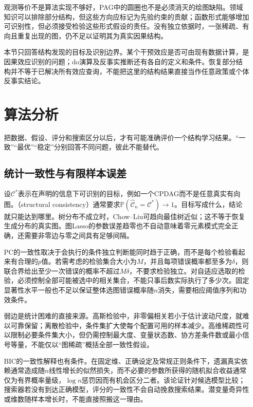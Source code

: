 观测等价不是算法实现不够好，PAG中的圆圈也不是必须消灭的绘图缺陷。领域知识可以排除部分结构，但这些方向应标记为先验约束的贡献；函数形式能够增加可识别性，但必须接受检验这些形式假设的责任。没有独立依据时，一张稀疏、有向且重复出现的图，仍不足以证明其为真实因果结构。

本节只回答结构发现的目标及识别边界。某个干预效应是否可由现有数据计算，是因果效应识别的问题；do演算及反事实推断还有各自的定义和条件。恢复部分结构并不等于已解决所有效应查询，不能把这里的结构结果直接当作任意政策或个体反事实结论。

\section{算法分析}
\label{sec:pgm-structure-learning-analysis}

把数据、假设、评分和搜索区分以后，才有可能准确评价一个结构学习结果。“一致”“最优”“稳定”分别回答不同问题，彼此不能替代。

\subsection{统计一致性与有限样本误差}
\label{sec:pgm-structure-learning-consistency}

设$\mathcal{C}^{*}$表示在声明的信息下可识别的目标，例如一个CPDAG而不是任意真实有向图。（structural consistency）通常要求$\mathbb{P}(\widehat{\mathcal{C}}_n=\mathcal{C}^{*})\to1$。目标写成什么，结论就只能达到哪里。树分布不成立时，Chow--Liu可趋向最佳树近似；这不等于恢复生成分布的真实图。图Lasso的参数误差趋零也不自动意味着零元素模式完全正确，还需要非零边与零之间具有足够间隔。

PC的一致性取决于会执行的条件独立判断能同时趋于正确，而不是每个检验看起来有合理的$p$值。若需考虑的检验集合大小为$M$，并且每项错误概率都至多为$\delta$，则联合界给出至少一次错误的概率不超过$M\delta$，不要求检验独立。对自适应选取的检验，必须控制全部可能被选中的相关集合，不能只事后数实际执行了多少次。固定显著性水平一般也不足以保证整体选图错误概率随$n$消失，需要相应阈值序列和功效条件。

弱边是统计困难的直接来源。高斯检验中，非零偏相关若小于估计波动尺度，就难以可靠保留；离散检验中，条件集扩大使每个配置可用的样本减少。高维稀疏性可以限制必要条件集大小，但仍需控制最大度、变量状态数、协方差条件数或最小信号等量，不能仅以“图稀疏”概括全部一致性假设。

BIC的一致性解释也有条件。在固定维、正确设定及常规正则条件下，遗漏真实依赖通常造成随$n$线性增长的似然损失，而不必要的参数所获得的随机拟合收益通常仅为有界概率量级，$\log n$惩罚因而有机会区分二者。该论证针对候选模型比较；搜索器若没有到达正确模型，评分的一致性不会自动挽救搜索结果。潜变量奇异性或维数随样本增长时，不能直接照搬这一理由。

